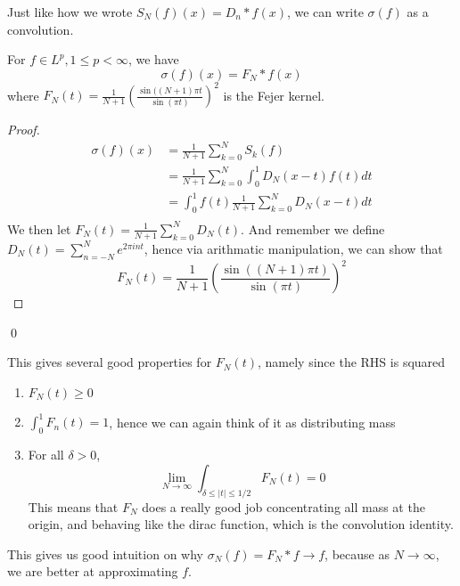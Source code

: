 Just like how we wrote $S_N(f)(x)=D_n\ast f(x)$, we can write $\sigma(f)$ as a convolution.
\begin{proposition}
    For $f\in L^p, 1\leq p<\infty$, we have
    \begin{equation*}
        \sigma(f)(x)=F_N\ast f(x)
    \end{equation*}
    where $F_N(t)=\frac{1}{N+1}\left(\frac{\sin((N+1)\pi t}{\sin(\pi t)} \right)^2$ is the Fejer kernel.
\end{proposition}
\begin{proof}
    \begin{align*}
        \sigma(f)(x)&=\frac{1}{N+1}\sum_{k=0}^NS_k(f)\\
        &= \frac{1}{N+1}\sum_{k=0}^N\int_0^1D_N(x-t)f(t)dt\\
        &=\int_0^1f(t)\frac{1}{N+1}\sum_{k=0}^ND_N(x-t)dt\\
    \end{align*}
    We then let $F_N(t)=\frac{1}{N+1}\sum_{k=0}^ND_N(t)$. And remember we define $D_N(t)=\sum_{n=-N}^Ne^{2\pi int}$, hence via arithmatic manipulation, we can show that 
    \begin{equation*}
        F_N(t)=\frac{1}{N+1}\left(\frac{\sin((N+1)\pi t)}{\sin(\pi t)}\right)^2
    \end{equation*}
\end{proof}
\qed

\begin{remark}
    This gives several good properties for $F_N(t)$, namely since the RHS is squared
    \begin{enumerate}
        \item $F_N(t)\geq 0$
        \item $\int_0^1F_n(t)=1$, hence we can again think of it as distributing mass
        \item For all $\delta>0$,
         \begin{equation*}
            \lim_{N\to\infty}\int_{\delta\leq|t|\leq1/2}F_N(t)=0
        \end{equation*}
        This means that $F_N$ does a really good job concentrating all mass at the origin, and behaving like the dirac function, which is the convolution identity.
    \end{enumerate}

    This gives us good intuition on why $\sigma_N(f)=F_N\ast f\to f$, because as $N\to\infty$, we are better at approximating $f$.
\end{remark}

